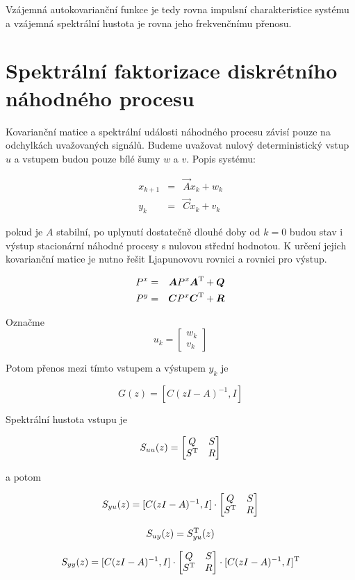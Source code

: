 Vzájemná autokovarianční funkce je tedy rovna impulsní charakteristice systému a vzájemná spektrální hustota je rovna jeho frekvenčnímu přenosu.

\section{Spektrální faktorizace diskrétního náhodného procesu}

Kovarianční matice a spektrální události náhodného procesu závisí pouze na odchylkách uvažovaných signálů. Budeme uvažovat nulový deterministický vstup $u$ a vstupem budou pouze bílé šumy $w$ a $v$. Popis systému:

\begin{eqnarray*}
x_{k+1} & = & \vec{A}x_k + w_k\\
y_k & = & \vec{C}x_k + v_k
\end{eqnarray*}

pokud je $A$ stabilní, po uplynutí dostatečně dlouhé doby od $k=0$ budou stav i výstup stacionární náhodné procesy s nulovou střední hodnotou. K určení jejich kovarianční matice je nutno řešit Ljapunovovu rovnici a rovnici pro výstup.

\begin{eqnarray*}
P^x & = & \boldsymbol{A}P^x\boldsymbol{A}^{\mathrm{T}} + \boldsymbol{Q}\\
P^y & = & \boldsymbol{C}P^x\boldsymbol{C}^{\mathrm{T}} + \boldsymbol{R}
\end{eqnarray*}

Označme
\[ u_k = 
\begin{bmatrix}
w_k\\v_k
\end{bmatrix}
\]

Potom přenos mezi tímto vstupem a výstupem $y_k$ je

\[ G(z) = [C(zI-A)^{-1}, I] \]

Spektrální hustota vstupu je 

\[ S_{uu}(z) =
\begin{bmatrix}
Q & S\\
S^{\mathrm{T}} & R
\end{bmatrix}
\]

a potom

\[
S_{yu}(z) = [C(zI-A)^{-1}, I]\cdot
\begin{bmatrix}
Q & S\\ S^{\mathrm{T}} & R
\end{bmatrix}
\]

\[ S_{uy}(z) = S^{\mathrm{T}}_{yu}(z) \]

\[ S_{yy}(z) = [C(zI-A)^{-1}, I]\cdot 
\begin{bmatrix}
Q & S\\ S^{\mathrm{T}} & R
\end{bmatrix}\cdot [C(zI-A)^{-1}, I]^{\mathrm{T}}
\]


